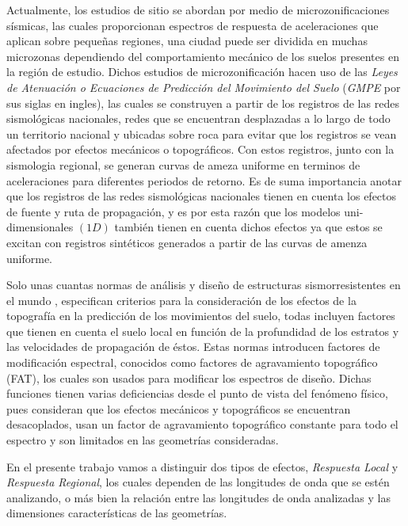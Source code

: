 \documentclass[spanish,letterpaper,12pt,twoside,openany]{article}
\begin{document}
Actualmente, los estudios de sitio se abordan por medio de microzonificaciones sísmicas, las cuales proporcionan espectros de respuesta de aceleraciones que aplican sobre pequeñas regiones, una ciudad puede ser dividida en muchas microzonas dependiendo del comportamiento mecánico de los suelos presentes en la región de estudio. Dichos estudios de microzonificación hacen uso de las \textit{Leyes de Atenuación o Ecuaciones de Predicción del Movimiento del Suelo} (\textit{GMPE} por sus siglas en ingles), las cuales se construyen a partir de los registros de las redes sismológicas nacionales, redes que se encuentran desplazadas a lo largo de todo un territorio nacional y ubicadas sobre roca para evitar que los registros se vean afectados por efectos mecánicos o topográficos. Con estos registros, junto con la sismologia regional, se generan curvas de ameza uniforme en terminos de aceleraciones para diferentes periodos de retorno. Es de suma importancia anotar que los registros de las redes sismológicas nacionales tienen en cuenta los efectos de fuente y ruta de propagación, y es por esta razón que los modelos uni-dimensionales $\left( 1D \right)$ también tienen en cuenta dichos efectos ya que estos se excitan con registros sintéticos generados a partir de las curvas de amenza uniforme.

Solo unas cuantas normas de análisis y diseño de estructuras sismorresistentes en el mundo \citep{EC8, AFPS1995}, especifican criterios para la consideración de los efectos de la topografía en la predicción de los movimientos del suelo, todas incluyen factores que tienen en cuenta el suelo local en función de la profundidad de los estratos y las velocidades de propagación de éstos. Estas normas introducen factores de modificación espectral, conocidos como factores de agravamiento topográfico (FAT), los cuales son usados para modificar los espectros de diseño. Dichas funciones tienen varias deficiencias desde el punto de vista del fenómeno físico, pues consideran que los efectos mecánicos y topográficos se encuentran desacoplados, usan un factor de agravamiento topográfico constante para todo el espectro y son limitados en las geometrías consideradas.

En el presente trabajo vamos a distinguir dos tipos de efectos, \textit{Respuesta Local} y \textit{Respuesta Regional}, los cuales dependen de las longitudes de onda que se estén analizando, o más bien la relación entre las longitudes de onda analizadas y las dimensiones características de las geometrías.
\end{document}
